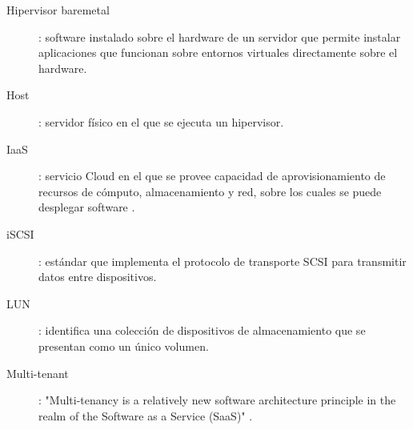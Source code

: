 \begin{description}
  \label{itm:datastore}
  \item [Hipervisor baremetal]: software instalado sobre el hardware de un servidor que permite instalar aplicaciones que funcionan sobre entornos virtuales directamente sobre el hardware.
  \label{itm:baremetal}
  \item [Host]: servidor físico en el que se ejecuta un hipervisor.
  \label{itm:host}
  \item [IaaS]: servicio Cloud en el que se provee capacidad de aprovisionamiento de recursos de cómputo, almacenamiento y red, sobre los cuales se puede desplegar software \cite{computing}.
  \label{itm:iaas}
  \item [iSCSI]: estándar que implementa el protocolo de transporte SCSI para transmitir datos entre dispositivos.
  \label{iscsi}
  \item [LUN]: identifica una colección de dispositivos de almacenamiento que se presentan como un único volumen.
  \label{itm:lun}
  \item [Multi-tenant]: "Multi-tenancy is a relatively new software architecture principle in the realm of the Software as a Service (SaaS)" \cite{multi-tenant}.


\end{description}
